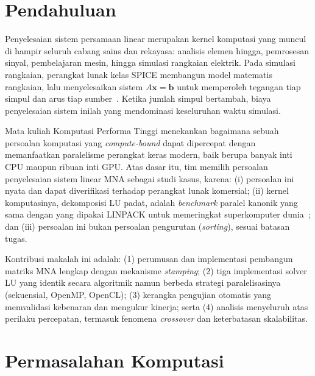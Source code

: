 \documentclass[conference]{IEEEtran}
\begin{document}
\section{Pendahuluan}
Penyelesaian sistem persamaan linear merupakan kernel komputasi yang muncul di hampir seluruh cabang sains dan rekayasa: analisis elemen hingga, pemrosesan sinyal, pembelajaran mesin, hingga simulasi rangkaian elektrik. Pada simulasi rangkaian, perangkat lunak kelas SPICE membangun model matematis rangkaian, lalu menyelesaikan sistem $A\mathbf{x}=\mathbf{b}$ untuk memperoleh tegangan tiap simpul dan arus tiap sumber~\cite{nagel1975spice}. Ketika jumlah simpul bertambah, biaya penyelesaian sistem inilah yang mendominasi keseluruhan waktu simulasi.

Mata kuliah Komputasi Performa Tinggi menekankan bagaimana sebuah persoalan komputasi yang \emph{compute-bound} dapat dipercepat dengan memanfaatkan paralelisme perangkat keras modern, baik berupa banyak inti CPU maupun ribuan inti GPU. Atas dasar itu, tim memilih persoalan penyelesaian sistem linear MNA sebagai studi kasus, karena: (i) persoalan ini nyata dan dapat diverifikasi terhadap perangkat lunak komersial; (ii) kernel komputasinya, dekomposisi LU padat, adalah \emph{benchmark} paralel kanonik yang sama dengan yang dipakai LINPACK untuk memeringkat superkomputer dunia~\cite{dongarra2003linpack}; dan (iii) persoalan ini bukan persoalan pengurutan (\emph{sorting}), sesuai batasan tugas.

Kontribusi makalah ini adalah: (1) perumusan dan implementasi pembangun matriks MNA lengkap dengan mekanisme \emph{stamping}; (2) tiga implementasi solver LU yang identik secara algoritmik namun berbeda strategi paralelisasinya (sekuensial, OpenMP, OpenCL); (3) kerangka pengujian otomatis yang memvalidasi kebenaran dan mengukur kinerja; serta (4) analisis menyeluruh atas perilaku percepatan, termasuk fenomena \emph{crossover} dan keterbatasan skalabilitas.

\section{Permasalahan Komputasi}
\end{document}
